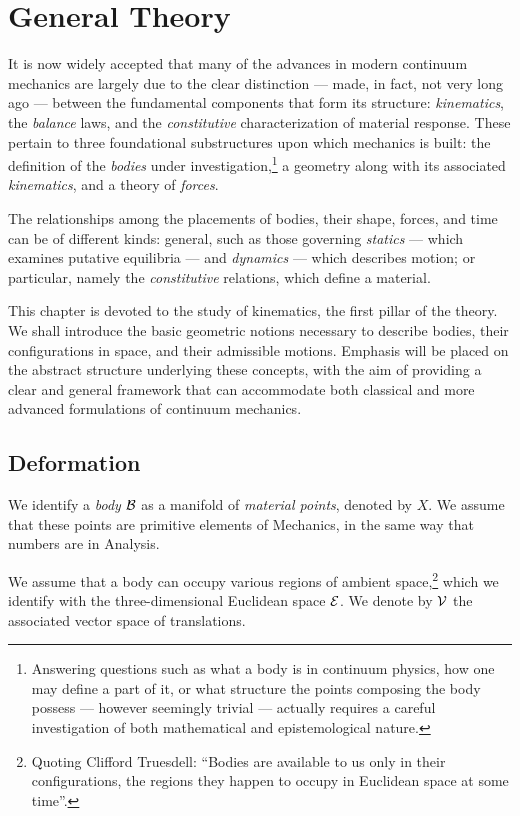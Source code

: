 \chapter{General Theory}

It is now widely accepted that many of the advances in modern continuum mechanics are largely due to the clear distinction — made, in fact, not very long ago — between the fundamental components that form its structure: \textit{kinematics}, the \textit{balance} laws, and the \textit{constitutive} characterization of material response. These pertain to three foundational substructures upon which mechanics is built: the definition of the \textit{bodies} under investigation,\footnote{Answering questions such as what a body is in continuum physics, how one may define a part of it, or what structure the points composing the body possess — however seemingly trivial — actually requires a careful investigation of both mathematical and epistemological nature.} a geometry along with its associated \textit{kinematics}, and a theory of \textit{forces}.

The relationships among the placements of bodies, their shape, forces, and time can be of different kinds: general, such as those governing \textit{statics} — which examines putative equilibria — and \textit{dynamics} — which describes motion; or particular, namely the \textit{constitutive} relations, which define a material.

This chapter is devoted to the study of kinematics, the first pillar of the theory. We shall introduce the basic geometric notions necessary to describe bodies, their configurations in space, and their admissible motions. Emphasis will be placed on the abstract structure underlying these concepts, with the aim of providing a clear and general framework that can accommodate both classical and more advanced formulations of continuum mechanics.


\section{Deformation}
We   identify a \textit{body} $\mathcal{B}$ as a manifold of \textit{material points}, denoted by $X$. We assume that these points are primitive elements of Mechanics, in the same way that numbers are in Analysis.

We assume that a body can occupy various regions of ambient space,\footnote{Quoting Clifford Truesdell: ``Bodies are available to us only in their configurations, the regions they happen
	to occupy in Euclidean space at some time''.} which we  identify with the three-dimensional Euclidean space $\mathcal{E}$. We denote by $\mathcal{V}$ the associated vector space of translations.


